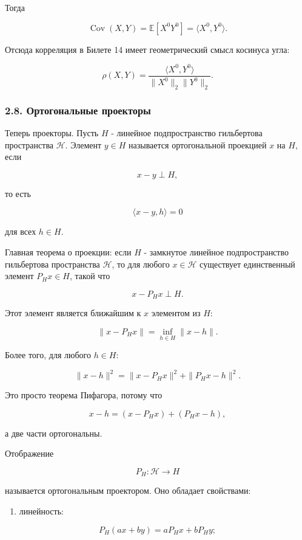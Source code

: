 \documentclass[
  11pt,
  a4paper,
]{article}
\providecommand{\tightlist}{%
  \setlength{\itemsep}{0pt}\setlength{\parskip}{0pt}}
\begin{document}
Тогда

\[
\operatorname{Cov}(X,Y)
=
\mathbb E[X^0Y^0]
=
\langle X^0,Y^0\rangle.
\]

Отсюда корреляция в Билете 14 имеет геометрический смысл косинуса угла:

\[
\rho(X,Y)
=
\frac{\langle X^0,Y^0\rangle}{\|X^0\|_2\|Y^0\|_2}.
\]

\subsubsection{2.8. Ортогональные
проекторы}\label{ux43eux440ux442ux43eux433ux43eux43dux430ux43bux44cux43dux44bux435-ux43fux440ux43eux435ux43aux442ux43eux440ux44b}

Теперь проекторы. Пусть \(H\) - линейное подпространство гильбертова
пространства \(\mathcal H\). Элемент \(y\in H\) называется ортогональной
проекцией \(x\) на \(H\), если

\[
x-y\perp H,
\]

то есть

\[
\langle x-y,h\rangle=0
\]

для всех \(h\in H\).

Главная теорема о проекции: если \(H\) - замкнутое линейное
подпространство гильбертова пространства \(\mathcal H\), то для любого
\(x\in\mathcal H\) существует единственный элемент \(P_Hx\in H\), такой
что

\[
x-P_Hx\perp H.
\]

Этот элемент является ближайшим к \(x\) элементом из \(H\):

\[
\|x-P_Hx\|
=
\inf_{h\in H}\|x-h\|.
\]

Более того, для любого \(h\in H\):

\[
\|x-h\|^2
=
\|x-P_Hx\|^2+\|P_Hx-h\|^2.
\]

Это просто теорема Пифагора, потому что

\[
x-h=(x-P_Hx)+(P_Hx-h),
\]

а две части ортогональны.

Отображение

\[
P_H:\mathcal H\to H
\]

называется ортогональным проектором. Оно обладает свойствами:

\begin{enumerate}
\def\labelenumi{\arabic{enumi}.}
\tightlist
\item
  линейность:
\end{enumerate}

\[
P_H(ax+by)=aP_Hx+bP_Hy;
\]
\end{document}
